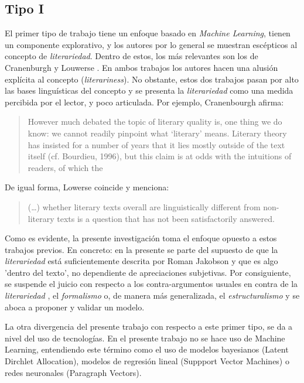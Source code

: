 \documentclass[12pt,letterpaper,twoside]{article}
\begin{document}
\subsection{Tipo I}
\label{sec:orgfaf056a}
El primer tipo de trabajo tiene un enfoque basado en \emph{Machine
Learning}, tienen un componente explorativo, y los autores por lo
general se muestran escépticos al concepto de \emph{literariedad}. Dentro
de estos, los más relevantes son los de Cranenburgh
\cite{van2019vector} \cite{van2015identifying} y Louwerse
\cite{louwerse2008computationally}. En ambos trabajos los autores
hacen una alusión explícita al concepto (\emph{literariness}). No obstante,
estos dos trabajos pasan por alto las bases linguísticas del concepto
y se presenta la \emph{literariedad} como una medida percibida por el
lector, y poco articulada. Por ejemplo, Cranenbourgh afirma:

\begin{quote}
However much debated the topic of literary quality is, one thing we do
know: we cannot readily pinpoint what ‘literary’ means. Literary
theory has insisted for a number of years that it lies mostly outside
of the text itself (cf. Bourdieu, 1996), but this claim is at odds
with the intuitions of readers, of which the
\cite[pg. 58]{van2015identifying}
\end{quote}


De igual forma, Lowerse coincide y menciona:


\begin{quote}
(\ldots{}) whether literary texts overall are linguistically different from
non-literary texts is a question that has not been satisfactorily
answered.\cite[pg. 176]{louwerse2008computationally}
\end{quote}

Como es evidente, la presente investigación toma el enfoque opuesto a
estos trabajos previos. En concreto: en la presente se parte del
supuesto de que la \emph{literariedad} está suficientemente descrita por
Roman Jakobson y que es algo 'dentro del texto', no dependiente de
apreciaciones subjetivas. Por consiguiente, se suspende el juicio con
respecto a los contra-argumentos usuales en contra de la
\emph{literariedad} \cite{chuit2019epistemologia}, el \emph{formalismo} o, de
manera más generalizada, el \emph{estructuralismo} y se aboca a proponer y
validar un modelo.

La otra divergencia del presente trabajo con respecto a este primer
tipo, se da a nivel del uso de tecnologías. En el presente trabajo no
se hace uso de Machine Learning, entendiendo este término como el uso
de modelos bayesianos (Latent Dirchlet Allocation), modelos de
regresión lineal (Suppport Vector Machines) o redes neuronales
(Paragraph Vectors).
\end{document}
